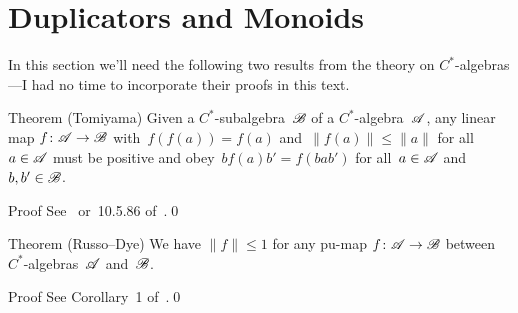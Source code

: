 \documentclass[a]{subfiles}
\begin{document}
\section{Duplicators and Monoids}
\begin{parsec}%
\begin{point}%
In this section we'll need the following two results from the theory
on $C^*$-algebras---I had no time
to incorporate their proofs in this text.
\end{point}
\begin{point}[tomiyama]{Theorem (Tomiyama)}%
Given a $C^*$-subalgebra~$\mathscr{B}$
of a $C^*$-algebra~$\mathscr{A}$,
any linear map $f\colon \mathscr{A}\to\mathscr{B}$
with~$f(f(a))=f(a)$ and~$\|f(a)\|\leq\|a\|$ 
for all~$a\in \mathscr{A}$
must be positive
and obey~$bf(a)b'=f(bab')$
for all~$a\in\mathscr{A}$ and~$b,b'\in\mathscr{B}$.
\begin{point}{Proof}%
See~\cite{tomiyama}
or~10.5.86 of~\cite{kr}.\qed
\end{point}
\end{point}
\begin{point}{Theorem (Russo--Dye)}%
We have $\|f\|\leq 1$
for any pu-map $f\colon \mathscr{A}\to\mathscr{B}$
between $C^*$-algebras~$\mathscr{A}$
and~$\mathscr{B}$.
\begin{point}{Proof}%
See Corollary~1 of~.\qed
\end{point}
\end{point}
\end{parsec}
\end{document}
